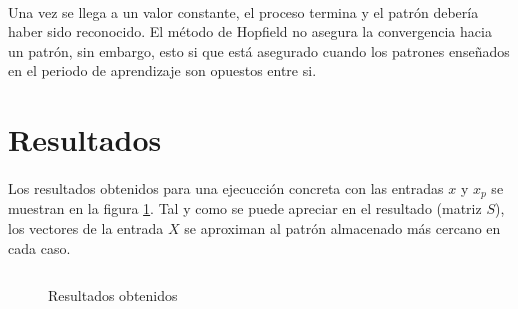 \documentclass[10pt, a4paper,spanish]{article}
\begin{document}
		\paragraph{}
		Una vez se llega a un valor constante, el proceso termina y el patrón debería haber sido reconocido. El método de Hopfield no asegura la convergencia hacia un patrón, sin embargo, esto si que está asegurado cuando los patrones enseñados en el periodo de aprendizaje son opuestos entre si.


	\section{Resultados}

		\paragraph{}
		Los resultados obtenidos para una ejecucción concreta con las entradas $x$ y $x_p$ se muestran en la figura \ref{results}. Tal y como se puede apreciar en el resultado (matriz $S$), los vectores de la entrada $X$ se aproximan al patrón almacenado más cercano en cada caso.

		\begin{figure}[htpb!]
			\centering
			\inputminted{bash}{../output.txt}
			\caption{Resultados obtenidos}
			\label{results}
		\end{figure}
\end{document}
